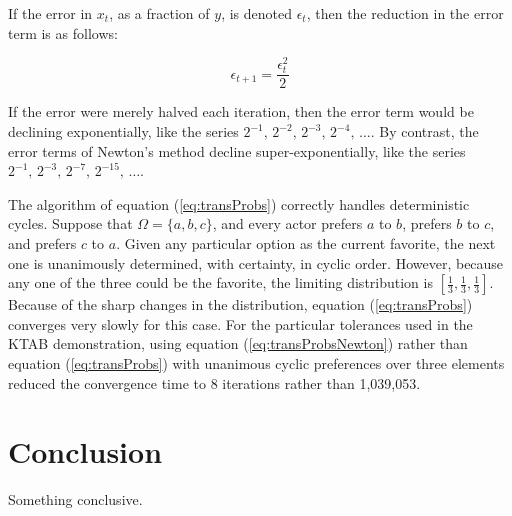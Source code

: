 \documentclass[a4paper,10pt]{article}
\begin{document}
If the error in $x_t$, as a fraction of $y$, is denoted $\epsilon_t$, then the reduction in the error term is as follows:

\begin{equation}
\epsilon_{t+1} = \frac {\epsilon_{t}^2} {2}
\end{equation}

If the error were merely halved each iteration, then the error term would be declining exponentially, like the series
$2^{-1}, \, 2^{-2}, \, 2^{-3}, \, 2^{-4}, \, \ldots$. By contrast, the error terms of Newton's method decline super-exponentially,
like the series  $2^{-1}, \, 2^{-3}, \, 2^{-7}, \, 2^{-15}, \, \ldots$. 



The algorithm of equation (\ref{eq:transProbs})  correctly handles deterministic cycles. 
Suppose that $\Omega = \{ a, b, c \}$, and every actor prefers $a$ to $b$, prefers $b$ to $c$, and prefers $c$ to $a$. 
Given any particular option as the current favorite, the next one is
unanimously determined, with certainty,
in cyclic order. However, because any one
of the three could be the favorite,  the limiting distribution is $[ \frac{1}{3},  \frac{1}{3},  \frac{1}{3} ]$. 
Because of the sharp changes in the distribution, equation (\ref{eq:transProbs})  converges very slowly for this case.
For the particular tolerances used in the KTAB demonstration, using equation  (\ref{eq:transProbsNewton}) 
rather than equation  (\ref{eq:transProbs})    with unanimous cyclic preferences over three elements
reduced the convergence time to 8 iterations rather than 1,039,053.


\section{Conclusion}
Something conclusive.
\end{document}

